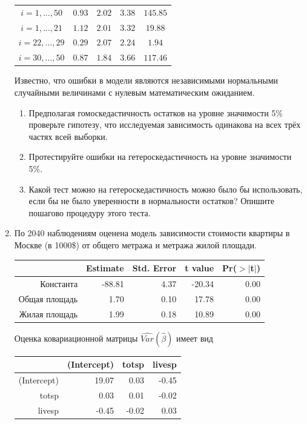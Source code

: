 \documentclass[12pt, a4paper]{article}\usepackage[]{graphicx}\usepackage[]{color}
\begin{document}
\begin{enumerate}
\begin{tabular}{c|cccc}
\hline
$i=1,\ldots, 50$ & $0.93$ & $2.02$ & $3.38$ & $145.85$ \\
$i=1,\ldots, 21$ & $1.12$ & $2.01$ & $3.32$ & $19.88$ \\
$i=22,\ldots, 29$ & $0.29$ & $2.07$ & $2.24$ & $1.94$ \\
$i=30,\ldots, 50$ & $0.87$ & $1.84$ & $3.66$ & $117.46$ \\
\end{tabular}

Известно, что ошибки в модели являются независимыми нормальными случайными величинами с нулевым математическим ожиданием.

\begin{enumerate}
\item Предполагая гомоскедастичность остатков на уровне значимости 5\% проверьте гипотезу, что исследуемая зависимость одинакова на всех трёх частях всей выборки.
\item Протестируйте ошибки на гетероскедастичность на уровне значимости 5\%.
\item Какой тест можно на гетероскедастичность можно было бы использовать, если бы не было уверенности в нормальности остатков? Опишите пошагово процедуру этого теста.
\end{enumerate}

\newpage

\item По 2040 наблюдениям оценена модель зависимости стоимости квартиры в Москве (в 1000\$) от общего метража и метража жилой площади.
\begin{table}[ht]
\centering
\begin{tabular}{rrrrr}
  \hline
 & Estimate & Std. Error & t value & Pr($>$$|$t$|$) \\ 
  \hline
Константа & -88.81 & 4.37 & -20.34 & 0.00 \\ 
  Общая площадь & 1.70 & 0.10 & 17.78 & 0.00 \\ 
  Жилая площадь & 1.99 & 0.18 & 10.89 & 0.00 \\ 
   \hline
\end{tabular}
\end{table}


Оценка ковариационной матрицы $\widehat{Var}(\hat{\beta})$ имеет вид
\begin{table}[ht]
\centering
\begin{tabular}{rrrr}
  \hline
 & (Intercept) & totsp & livesp \\ 
  \hline
(Intercept) & 19.07 & 0.03 & -0.45 \\ 
  totsp & 0.03 & 0.01 & -0.02 \\ 
  livesp & -0.45 & -0.02 & 0.03 \\ 
   \hline
\end{tabular}
\end{table}



\end{enumerate}
\end{document}
